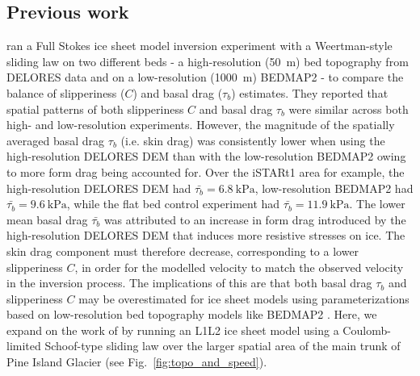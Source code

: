 \subsection{Previous work} %

\citet{Kyrke-SmithRelevanceDetailBasal2018} ran a Full Stokes ice sheet model inversion experiment with a Weertman-style sliding law on two different beds - a high-resolution (\SI{50}{\metre}) bed topography from DELORES data \citep{BinghamDiverselandscapesPine2017} and on a low-resolution (\SI{1000}{\metre}) BEDMAP2 \citep{FretwellBedmap2improvedice2013} - to compare the balance of slipperiness ($C$) and basal drag ($\tau_b$) estimates.
They reported that spatial patterns of both slipperiness $C$ and basal drag $\tau_b$ were similar across both high- and low-resolution experiments.
However, the magnitude of the spatially averaged basal drag $\tau_b$ (i.e. skin drag) was consistently lower when using the high-resolution DELORES \gls{DEM} than with the low-resolution BEDMAP2 owing to more form drag being accounted for.
Over the iSTARt1 area for example, the high-resolution DELORES \gls{DEM} had $\bar{\tau_b} = \SI{6.8}{\kilo\pascal}$, low-resolution BEDMAP2 had $\bar{\tau_b} = \SI{9.6}{\kilo\pascal}$, while the flat bed control experiment had $\bar{\tau_b} = \SI{11.9}{\kilo\pascal}$.
The lower mean basal drag $\bar{\tau_b}$ was attributed to an increase in form drag introduced by the high-resolution DELORES DEM that induces more resistive stresses on ice.
The skin drag component must therefore decrease, corresponding to a lower slipperiness $C$, in order for the modelled velocity to match the observed velocity in the inversion process.
The implications of this are that both basal drag $\tau_b$ and slipperiness $C$ may be overestimated for ice sheet models using parameterizations based on low-resolution bed topography models like BEDMAP2 \citep{Kyrke-SmithRelevanceDetailBasal2018}.
Here, we expand on the work of \citet{Kyrke-SmithRelevanceDetailBasal2018} by running an L1L2 ice sheet model \citep[\gls{ISSM};][]{LarourContinentalscalehigh2012} using a Coulomb-limited Schoof-type sliding law \citep{JoughinRegularizedCoulombFriction2019,Schoofeffectcavitationglacier2005} over the larger spatial area of the main trunk of Pine Island Glacier (see Fig.~\ref{fig:topo_and_speed}).


